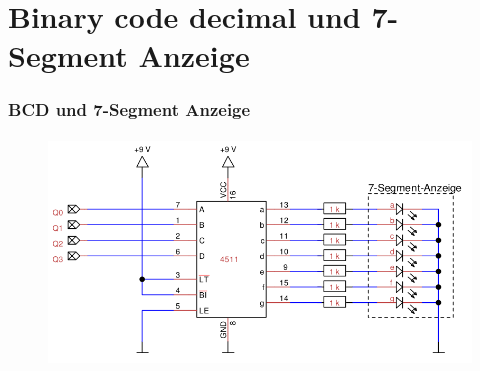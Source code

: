 \section{Binary code decimal und 7-Segment Anzeige} %
\label{sec:Binary code decimal und 7-Segment Anzeige}
\begin{frame}
    \frametitle{BCD und 7-Segment Anzeige}
    \framesubtitle{}
    \begin{figure}[H]
    \begin{center}
            \includegraphics[scale=0.3]{./img/schaltung/bcd.png}
    \end{center}
    \end{figure}
\end{frame}
